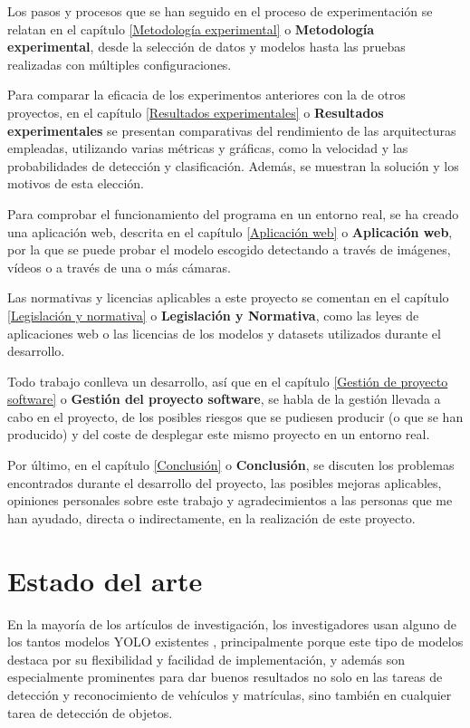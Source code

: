 \documentclass[12pt,a4paper,onecolumn,oneside]{report}
\begin{document}
Los pasos y procesos que se han seguido en el proceso de experimentación se relatan en el capítulo \ref{Metodología experimental} o \textbf{Metodología experimental}, desde la selección de datos y modelos hasta las pruebas realizadas con múltiples configuraciones.

Para comparar la eficacia de los experimentos anteriores con la de otros proyectos, en el capítulo \ref{Resultados experimentales} o \textbf{Resultados experimentales} se presentan comparativas del rendimiento de las arquitecturas empleadas, utilizando varias métricas y gráficas, como la velocidad y las probabilidades de detección y clasificación. Además, se muestran la solución y los motivos de esta elección.

Para comprobar el funcionamiento del programa en un entorno real, se ha creado una aplicación web, descrita en el capítulo \ref{Aplicación web} o \textbf{Aplicación web}, por la que se puede probar el modelo escogido detectando a través de imágenes, vídeos o a través de una o más cámaras.

Las normativas y licencias aplicables a este proyecto se comentan en el capítulo \ref{Legislación y normativa} o \textbf{Legislación y Normativa}, como las leyes de aplicaciones web o las licencias de los modelos y datasets utilizados durante el desarrollo.

Todo trabajo conlleva un desarrollo, así que en el capítulo \ref{Gestión de proyecto software} o \textbf{Gestión del proyecto software}, se habla de la gestión llevada a cabo en el proyecto, de los posibles riesgos que se pudiesen producir (o que se han producido) y del coste de desplegar este mismo proyecto en un entorno real.

Por último, en el capítulo \ref{Conclusión} o \textbf{Conclusión}, se discuten los problemas encontrados durante el desarrollo del proyecto, las posibles mejoras aplicables, opiniones personales sobre este trabajo y agradecimientos a las personas que me han ayudado, directa o indirectamente, en la realización de este proyecto.



\chapter{Estado del arte}
\label{Estado del arte}

En la mayoría de los artículos de investigación, los investigadores usan alguno de los tantos modelos YOLO existentes \cite{sapkota2026yolo26keyarchitecturalenhancements}, principalmente porque este tipo de modelos destaca por su flexibilidad y facilidad de implementación, y además son especialmente prominentes para dar buenos resultados no solo en las tareas de detección y reconocimiento de vehículos y matrículas, sino también en cualquier tarea de detección de objetos.
\end{document}
